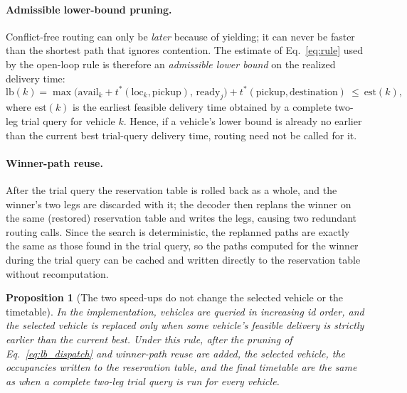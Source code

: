 \documentclass[manuscript,screen,review]{acmart}
\newtheorem{prop}{Proposition}
\begin{document}
\paragraph{Admissible lower-bound pruning.}
Conflict-free routing can only be \emph{later} because of yielding; it can never be faster than the shortest path that ignores contention. The estimate of Eq.~\eqref{eq:rule} used by the open-loop rule is therefore an \emph{admissible lower bound} on the realized delivery time:
\begin{equation}
\label{eq:lb_dispatch}
\mathrm{lb}(k)=\max\bigl(\mathrm{avail}_k+t^{*}(\mathrm{loc}_k,\text{pickup}),\,
\mathrm{ready}_j\bigr)+t^{*}(\text{pickup},\text{destination})\ \le\ \mathrm{est}(k),
\end{equation}
where $\mathrm{est}(k)$ is the earliest feasible delivery time obtained by a complete two-leg trial query for vehicle $k$.
Hence, if a vehicle's lower bound is already no earlier than the current best trial-query delivery time, routing need not be called for it.

\paragraph{Winner-path reuse.}
After the trial query the reservation table is rolled back as a whole, and the winner's two legs are discarded with it; the decoder then replans the winner on the same (restored) reservation table and writes the legs, causing two redundant routing calls.
Since the search is deterministic, the replanned paths are exactly the same as those found in the trial query, so the paths computed for the winner during the trial query can be cached and written directly to the reservation table without recomputation.

\begin{prop}[The two speed-ups do not change the selected vehicle or the timetable]
  \label{prop:speedup_equiv}
  In the implementation, vehicles are queried in increasing id order, and the selected vehicle is replaced only when some vehicle's feasible delivery is strictly earlier than the current best.
  Under this rule, after the pruning of Eq.~\eqref{eq:lb_dispatch} and winner-path reuse are added, the selected vehicle, the occupancies written to the reservation table, and the final timetable are the same as when a complete two-leg trial query is run for every vehicle.
\end{prop}
\end{document}
